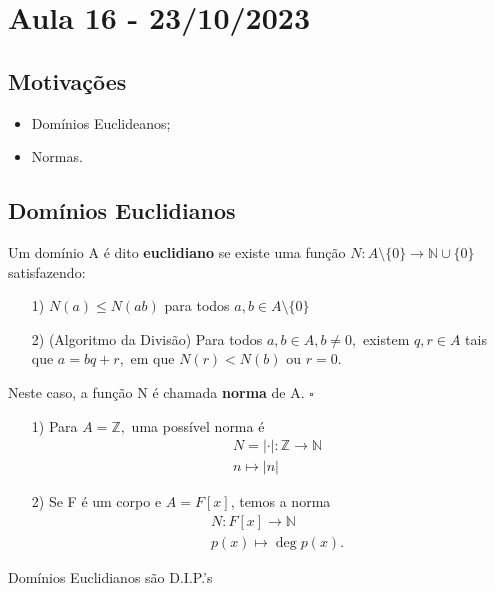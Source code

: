 \documentclass[algebraII_notes.tex]{subfiles}
\begin{document}
\section{Aula 16 - 23/10/2023}
\subsection{Motivações}
\begin{itemize}
	\item Domínios Euclideanos;
	\item Normas.
\end{itemize}
\subsection{Domínios Euclidianos}
\begin{def*}
	Um domínio A é dito \textbf{euclidiano} se existe uma função \(N:A\setminus{\{0\}}\rightarrow \mathbb{N}\cup\{0\}\)
	satisfazendo:
	\begin{itemize}
		\item[1)] \(N(a)\leq N(ab)\) para todos \(a, b\in A\setminus{\{0\}}\)
		\item[2)] (Algoritmo da Divisão) Para todos \(a, b\in A, b\neq0,\) existem \(q,r\in A\) tais que
		      \(a = bq + r,\) em que \(N(r) < N(b)\) ou \(r = 0\).
	\end{itemize}
	Neste caso, a função N é  chamada \textbf{norma} de A. \(\square\)
\end{def*}
\begin{example}
	\begin{itemize}
		\item[1)] Para \(A = \mathbb{Z},\) uma possível norma é
		      \begin{align*}
			       & N=|\cdot |:\mathbb{Z}\rightarrow \mathbb{N} \\
			       & n\mapsto |n|
		      \end{align*}
		\item[2)] Se F é um corpo e \(A = F[x]\), temos a norma
		      \begin{align*}
			       & N:F[x]\rightarrow \mathbb{N} \\
			       & p(x)\mapsto \deg{p(x)}.
		      \end{align*}
	\end{itemize}
\end{example}
\begin{theorem*}
	Domínios Euclidianos são D.I.P.'s
\end{theorem*}
\end{document}
